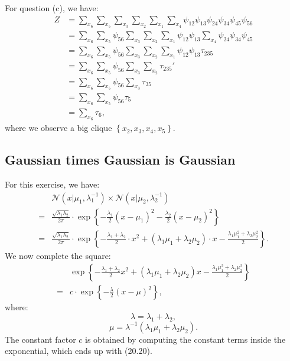 \documentclass[UTF8]{ctexart}
\begin{document}
For question (c), we have:
$$
\begin{aligned}
Z&=\sum_{x_{6}}\sum_{x_{5}}\sum_{x_{3}}\sum_{x_{2}}\sum_{x_{1}}\sum_{x_{4}}\psi_{12}\psi_{13}\psi_{24}\psi_{34}\psi_{45}\psi_{56}\\
&=\sum_{x_{6}}\sum_{x_{5}}\psi_{56}\sum_{x_{3}}\sum_{x_{2}}\sum_{x_{1}}\psi_{12}\psi_{13}\sum_{x_{4}}\psi_{24}\psi_{34}\psi_{45}\\
&=\sum_{x_{6}}\sum_{x_{5}}\psi_{56}\sum_{x_{3}}\sum_{x_{2}}\sum_{x_{1}}\psi_{12}\psi_{13}\tau_{235}\\
&=\sum_{x_{6}}\sum_{x_{5}}\psi_{56}\sum_{x_{3}}\sum_{x_{2}}\tau_{235}'\\
&=\sum_{x_{6}}\sum_{x_{5}}\psi_{56}\sum_{x_{3}}\tau_{35}\\
&=\sum_{x_{6}}\sum_{x_{5}}\psi_{56}\tau_{5}\\
&=\sum_{x_{6}}\tau_{6},
\end{aligned}
$$
where we observe a big clique $\left\{x_{2},x_{3},x_{4},x_{5} \right\}$.

\subsection{Gaussian times Gaussian is Gaussian}
For this exercise, we have:
$$
\begin{aligned}
\ &\mathcal{N}(x|\mu_{1},\lambda_{1}^{-1})\times \mathcal{N}(x|\mu_{2},\lambda_{2}^{-1}) \\
 =&\frac{\sqrt{\lambda_{1}\lambda_{2}}}{2\pi}\cdot\exp\left\{ -\frac{\lambda_{1}}{2}(x-\mu_{1})^{2}-\frac{\lambda_{2}}{2}(x-\mu_{2})^{2}  \right\} \\
=& \frac{\sqrt{\lambda_{1}\lambda_{2}}}{2\pi} \cdot\exp\left\{ -\frac{\lambda_{1}+\lambda_{2}}{2}\cdot x^{2}+(\lambda_{1}\mu_{1}+\lambda_{2}\mu_{2})\cdot x-\frac{\lambda_{1}\mu_{1}^{2}+\lambda_{2}\mu_{2}^{2}}{2} \right\}.
\end{aligned}
$$
We now complete the square:
$$
\begin{aligned}
\ &\exp\left\{ -\frac{\lambda_{1}+\lambda_{2}}{2}x^{2}+(\lambda_{1}\mu_{1}+\lambda_{2}\mu_{2})x-\frac{\lambda_{1}\mu_{1}^{2}+\lambda_{2}\mu_{2}^{2}}{2} \right\} \\
=&c\cdot \exp\left\{-\frac{\lambda}{2}(x-\mu)^{2}\right\},
\end{aligned}
$$
where:
$$\lambda = \lambda_{1}+\lambda_{2},$$
$$\mu = \lambda^{-1}(\lambda_{1}\mu_{1}+\lambda_{2}\mu_{2}).$$
The constant factor $c$ is obtained by computing the constant terms inside the exponential, which ends up with (20.20).
\end{document}
